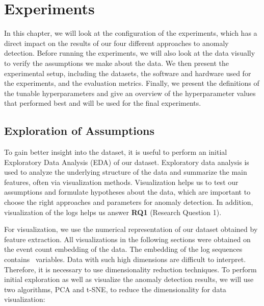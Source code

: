 \chapter{Experiments}
\label{chapter:experiments}

In this chapter, we will look at the configuration of the experiments, which has a direct impact on the results of our four different approaches to anomaly detection. Before running the experiments, we will also look at the data visually to verify the assumptions we make about the data. We then present the experimental setup, including the datasets, the software and hardware used for the experiments, and the evaluation metrics. Finally, we present the definitions of the tunable hyperparameters and give an overview of the hyperparameter values that performed best and will be used for the final experiments.

\section{Exploration of Assumptions}
To gain better insight into the dataset, it is useful to perform an initial Exploratory Data Analysis (EDA) \cite{eda} of our dataset. Exploratory data analysis is used to analyze the underlying structure of the data and summarize the main features, often via visualization methods. Visualization helps us to test our assumptions and formulate hypotheses about the data, which are important to choose the right approaches and parameters for anomaly detection. In addition, visualization of the logs helps us answer \textbf{RQ1} (Research Question 1).

For visualization, we use the numerical representation of our dataset obtained by feature extraction. All visualizations in the following sections were obtained on the event count embedding of the data. The embedding of the log sequences contains \featureVectorLength\ variables. Data with such high dimensions are difficult to interpret. Therefore, it is necessary to use dimensionality reduction techniques. To perform initial exploration as well as visualize the anomaly detection results, we will use two algorithms, PCA and t-SNE, to reduce the dimensionality for data visualization:

